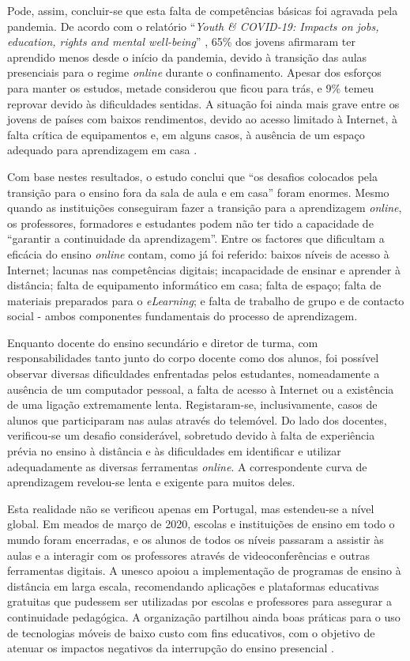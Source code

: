 Pode, assim, concluir-se que esta falta de competências básicas foi agravada pela pandemia. De acordo com o relatório ``\textit{Youth \& COVID-19: Impacts on jobs, education, rights and mental well-being}'' \cite{impactocovideducacao}, 65\% dos jovens afirmaram ter aprendido menos desde o início da pandemia, devido à transição das aulas presenciais para o regime \textit{online} durante o confinamento. Apesar dos esforços para manter os estudos, metade considerou que ficou para trás, e 9\% temeu reprovar devido às dificuldades sentidas. A situação foi ainda mais grave entre os jovens de países com baixos rendimentos, devido ao acesso limitado à Internet, à falta crítica de equipamentos e, em alguns casos, à ausência de um espaço adequado para aprendizagem em casa \cite{impactocovideducacao}.

Com base nestes resultados, o estudo conclui que ``os desafios colocados pela transição para o ensino fora da sala de aula e em casa'' foram enormes. Mesmo quando as instituições conseguiram fazer a transição para a aprendizagem \textit{online}, os professores, formadores e estudantes podem não ter tido a capacidade de ``garantir a continuidade da aprendizagem''. Entre os factores que dificultam a eficácia do ensino \textit{online} contam, como já foi referido: baixos níveis de acesso à Internet; lacunas nas competências digitais; incapacidade de ensinar e aprender à distância; falta de equipamento informático em casa; falta de espaço; falta de materiais preparados para o \textit{eLearning}; e falta de trabalho de grupo e de contacto social - ambos componentes fundamentais do processo de aprendizagem.

Enquanto docente do ensino secundário e diretor de turma, com responsabilidades tanto junto do corpo docente como dos alunos, foi possível observar diversas dificuldades enfrentadas pelos estudantes, nomeadamente a ausência de um computador pessoal, a falta de acesso à Internet ou a existência de uma ligação extremamente lenta. Registaram-se, inclusivamente, casos de alunos que participaram nas aulas através do telemóvel. Do lado dos docentes, verificou-se um desafio considerável, sobretudo devido à falta de experiência prévia no ensino à distância e às dificuldades em identificar e utilizar adequadamente as diversas ferramentas \textit{online}. A correspondente curva de aprendizagem revelou-se lenta e exigente para muitos deles.

Esta realidade não se verificou apenas em Portugal, mas estendeu-se a nível global. Em meados de março de 2020, escolas e instituições de ensino em todo o mundo foram encerradas, e os alunos de todos os níveis passaram a assistir às aulas e a interagir com os professores através de videoconferências e outras ferramentas digitais. A \acrfull{unesco} apoiou a implementação de programas de ensino à distância em larga escala, recomendando aplicações e plataformas educativas gratuitas que pudessem ser utilizadas por escolas e professores para assegurar a continuidade pedagógica. A organização partilhou ainda boas práticas para o uso de tecnologias móveis de baixo custo com fins educativos, com o objetivo de atenuar os impactos negativos da interrupção do ensino presencial \cite{unesco}.

